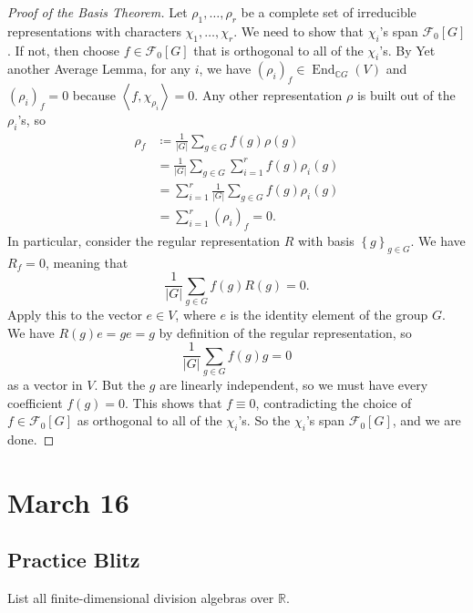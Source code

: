 \documentclass[12pt]{article}
\newcommand{\cx}{\mathbb{C}}
\newcommand{\real}{\mathbb{R}}
\newcommand\setb[1]{\left \{ #1 \right \}}
\theoremstyle{definition}
\DeclareMathOperator\End{End}
\begin{document}
\begin{proof}[Proof of the Basis Theorem]
    Let $\rho_1 , \dotsc , \rho_r$ be a complete set of irreducible representations with characters $\chi_1 , \dotsc , \chi_r$. We need to show that $\chi_i$'s span $\mathcal{F}_0[G]$. If not, then choose $f \in \mathcal{F}_0[G]$ that is orthogonal to all of the $\chi_i$'s. By Yet another Average Lemma, for any $i$, we have $\left( \rho_i \right)_f \in \End_{\cx G}(V)$ and $\left( \rho_i \right)_f = 0$ because $\left \langle f , \chi_{\rho_i} \right \rangle = 0$. Any other representation $\rho$ is built out of the $\rho_i$'s, so 
    \begin{equation}
        \begin{split}
            \rho_f & \coloneqq  \frac{1}{|G|} \sum\limits_{g \in G} f(g) \rho(g) \\
            & = \frac{1}{|G|} \sum\limits_{g \in G} \sum\limits_{i = 1}^r f(g) \rho_i(g) \\
            & = \sum\limits_{i = 1}^r \frac{1}{|G|} \sum\limits_{g \in G}f(g) \rho_i(g) \\
            & = \sum\limits_{i = 1}^r \left( \rho_i \right)_f = 0.
        \end{split}
    \end{equation}
    In particular, consider the regular representation $R$ with basis $\setb{g}_{g \in G}$. We have $R_f = 0$, meaning that 
    \begin{equation}
        \frac{1}{|G|} \sum\limits_{g \in G} f(g) R(g) = 0.
    \end{equation}
    Apply this to the vector $e \in V$, where $e$ is the identity element of the group $G$. We have $R(g)e = ge = g$ by definition of the regular representation, so 
    \begin{equation}
        \frac{1}{|G|} \sum\limits_{g \in G} f(g) g = 0
    \end{equation}
    as a vector in $V$. But the $g$ are linearly independent, so we must have every coefficient $f(g) = 0$. This shows that $f \equiv 0$, contradicting the choice of $f \in \mathcal{F}_0[G]$ as orthogonal to all of the $\chi_i$'s. So the $\chi_i$'s span $\mathcal{F}_0[G]$, and we are done.
\end{proof}
\section{March 16}
\subsection{Practice Blitz}
List all finite-dimensional division algebras over $\real$.
\end{document}
